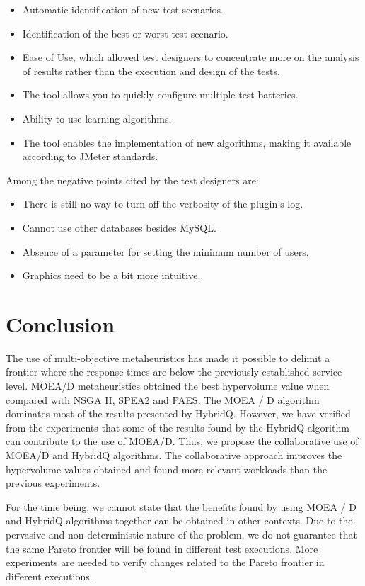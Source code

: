 \documentclass[espaco=umemeio,chapter=TITLE,twoside,openright]{abnt}
\begin{document}
\begin{itemize}
\item Automatic identification of new test scenarios.
\item Identification of the best or worst test scenario.
\item Ease of Use, which allowed test designers to concentrate more on the analysis of results rather than the execution and design of the tests.
\item The tool allows you to quickly configure multiple test batteries.
\item Ability to use learning algorithms.
\item The tool enables the implementation of new algorithms, making it available according to JMeter standards.
\end{itemize}

Among the negative points cited by the test designers are:

\begin{itemize}
\item There is still no way to turn off the verbosity of the plugin's log.
\item Cannot use other databases besides MySQL.
\item Absence of a parameter for setting the minimum number of users.
\item Graphics need to be a bit more intuitive.
\end{itemize}


\section{Conclusion}


The use of multi-objective metaheuristics has made it possible to delimit a frontier where the response times are below the previously established service level. MOEA/D metaheuristics obtained the best hypervolume value when compared with NSGA II, SPEA2 and PAES. The MOEA / D algorithm dominates most of the results presented by HybridQ. However, we have verified from the experiments that some of the results found by the HybridQ algorithm can contribute to the use of MOEA/D. Thus, we propose the collaborative use of  MOEA/D and HybridQ algorithms.  The collaborative approach improves the hypervolume values obtained and found more relevant workloads than the previous experiments. 

For the time being, we cannot state that the benefits found by using MOEA / D and HybridQ algorithms together can be obtained in other contexts. Due to the pervasive and non-deterministic nature of the problem, we do not guarantee that the same Pareto frontier will be found in different test executions.  More experiments are needed to verify changes related to the Pareto frontier in different executions.
\end{document}
